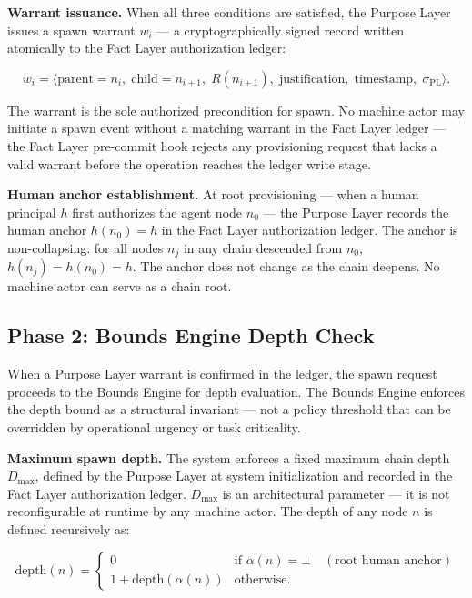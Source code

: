 \medskip
\noindent\textbf{Warrant issuance.} When all three conditions are satisfied, the Purpose Layer issues a spawn warrant $w_i$ — a cryptographically signed record written atomically to the Fact Layer authorization ledger:

\begin{equation}
w_i = \bigl\langle
\text{parent}=n_i,\;
\text{child}=n_{i+1},\;
R(n_{i+1}),\;
\text{justification},\;
\text{timestamp},\;
\sigma_{\text{PL}}
\bigr\rangle .
\label{eq:spawn-warrant}
\end{equation}

The warrant is the sole authorized precondition for spawn. No machine actor may initiate a spawn event without a matching warrant in the Fact Layer ledger — the Fact Layer pre-commit hook rejects any provisioning request that lacks a valid warrant before the operation reaches the ledger write stage.

\medskip
\noindent\textbf{Human anchor establishment.} At root provisioning — when a human principal $h$ first authorizes the agent node $n_0$ — the Purpose Layer records the human anchor $h(n_0) = h$ in the Fact Layer authorization ledger. The anchor is non-collapsing: for all nodes $n_j$ in any chain descended from $n_0$, $h(n_j) = h(n_0) = h$. The anchor does not change as the chain deepens. No machine actor can serve as a chain root.

\subsection{Phase 2: Bounds Engine Depth Check}
\label{sec:rs-bounds-depth}

When a Purpose Layer warrant is confirmed in the ledger, the spawn request proceeds to the Bounds Engine for depth evaluation. The Bounds Engine enforces the depth bound as a structural invariant — not a policy threshold that can be overridden by operational urgency or task criticality.

\medskip
\noindent\textbf{Maximum spawn depth.} The system enforces a fixed maximum chain depth $D_{\max}$, defined by the Purpose Layer at system initialization and recorded in the Fact Layer authorization ledger. $D_{\max}$ is an architectural parameter — it is not reconfigurable at runtime by any machine actor. The depth of any node $n$ is defined recursively as:

\begin{equation}
\text{depth}(n) =
\begin{cases}
0 & \text{if } \alpha(n) = \bot \quad (\text{root human anchor}) \\[6pt]
1 + \text{depth}(\alpha(n)) & \text{otherwise}.
\end{cases}
\label{eq:chain-depth}
\end{equation}

